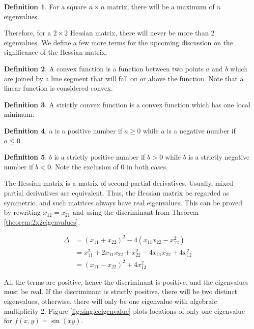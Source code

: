 \documentclass[12pt]{article}
\numberwithin{equation}{section}
\numberwithin{figure}{section}
\numberwithin{table}{section}
\theoremstyle{definition}
\newtheorem{definition}{Definition}[section]
\theoremstyle{remark}
\numberwithin{equation}{section}
\begin{document}
\begin{definition}
	For a square $n \times n$ matrix, there will be a maximum of $n$ eigenvalues.
\end{definition}

Therefore, for a $2 \times 2$ Hessian matrix, there will never be more than 2 eigenvalues. We define a few more terms for the upcoming discussion on the significance of the Hessian matrix.

\begin{definition}
	A convex function is a function between two points $a$ and $b$ which are joined by a line segment that will fall on or above the function. Note that a linear function is considered convex.
\end{definition}

\begin{definition}
	A strictly convex function is a convex function which has one local minimum.
\end{definition}

\begin{definition}
	$a$ is a positive number if $a \geq 0$ while $a$ is a negative number if $a \leq 0$.
\end{definition}

\begin{definition}
	$b$ is a strictly positive number if $b > 0$ while $b$ is a strictly negative number if $b < 0$. Note the exclusion of 0 in both cases.
\end{definition}

The Hessian matrix is a matrix of second partial derivatives. Usually, mixed partial derivatives are equivalent. Thus, the Hessian matrix be regarded as symmetric, and such matrices always have real eigenvalues. This can be proved by rewriting $x_{12} = x_{21}$ and using the discriminant from Theorem \ref{theorem:2x2eigenvalues}.

\begin{align*}
	\Delta
	&= (x_{11} + x_{22})^2 - 4(x_{11}x_{22} - x_{12}^2)
	\\
	&= x_{11}^2 + 2x_{11}x_{22} + x_{22}^2 - 4x_{11}x_{22} + 4x_{12}^2
	\\
	&= (x_{11} - x_{22})^2 + 4x_{12}^2
\end{align*}

All the terms are positive, hence the discriminant is positive, and the eigenvalues must be real. If the discriminant is strictly positive, there will be two distinct eigenvalues, otherwise, there will only be one eigenvalue with algebraic multiplicity 2. Figure \ref{fig:singleeigenvalue} plots locations of only one eigenvalue for $f(x, y) = \sin(xy)$.
\end{document}
